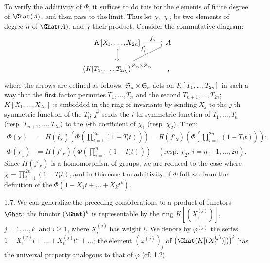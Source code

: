 To verify the additivity of \(\Phi\), it suffices to do this for the elements of finite degree of \(\Ghat(A)\), and then pass to the limit. Thus let \(\chi_1,\chi_2\) be two elements of degree \(n\) of \(\Ghat(A)\), and \(\chi\) their product. Consider the commutative diagram:
\[
\begin{tikzcd}[column sep=tiny]
K[X_1,\ldots,X_{2n}] \arrow[rr,"f_\chi"] \arrow[d,hook] && A\\
\bigl(K[T_1,\ldots,T_{2n}]\bigr)^{\mathfrak S_n\times\mathfrak S_n}
\arrow[urr,"f'_\chi"] && ,
\end{tikzcd}
\]
where the arrows are defined as follows: \(\mathfrak S_n\times\mathfrak S_n\) acts on \(K[T_1,\ldots,T_{2n}]\)
%
in such a way that the first factor permutes \(T_1,\ldots,T_n\) and the second \(T_{n+1},\ldots,T_{2n}\); \(K[X_1,\ldots,X_{2n}]\) is embedded in the ring of invariants by sending \(X_j\) to the \(j\)-th symmetric function of the \(T_i\); \(f'\) sends the \(i\)-th symmetric function of \(T_1,\ldots,T_n\) (resp. \(T_{n+1},\ldots,T_{2n}\)) to the \(i\)-th coefficient of \(\chi_1\) (resp. \(\chi_2\)). Then:
\[
\begin{aligned}
\Phi(\chi)
&=H(f_\chi)\left(\Phi\left(\prod_{i=1}^{2n}(1+T_it)\right)\right)
=H(f'_\chi)\left(\Phi\left(\prod_{i=1}^{2n}(1+T_it)\right)\right);\\
\Phi(\chi_1) &=H(f'_\chi)\left(\Phi\left(\prod_{i=1}^{n}(1+T_it)\right)\right)\quad(\text{resp. }\chi_2,\ i=n+1,\ldots,2n).
\end{aligned}
\]
Since \(H(f'_\chi)\) is a homomorphism of groups, we are reduced to the case where \(\chi=\prod_{i=1}^{2n}(1+T_it)\), and in this case the additivity of \(\Phi\) follows from the definition of the \(\Phi(1+X_1t+\ldots+X_k t^k)\).

1.7. We can generalize the preceding considerations to a product of functors \(\Ghat\); the functor \((\Ghat)^k\) is representable by the ring
\(K[(X_i^{(j)})]\), \(j=1,\ldots,k\), and \(i\geq 1\), where \(X_i^{(j)}\) has weight \(i\). We denote by \(\varphi^{(j)}\) the series \(1+X_1^{(j)}t+\ldots+X_n^{(j)}t^n+\ldots\); the element \((\varphi^{(j)})_j\) of \(\bigl(\Ghat(K[(X_i^{(j)})])\bigr)^k\) has the universal property analogous to that of \(\varphi\) (cf. 1.2).

